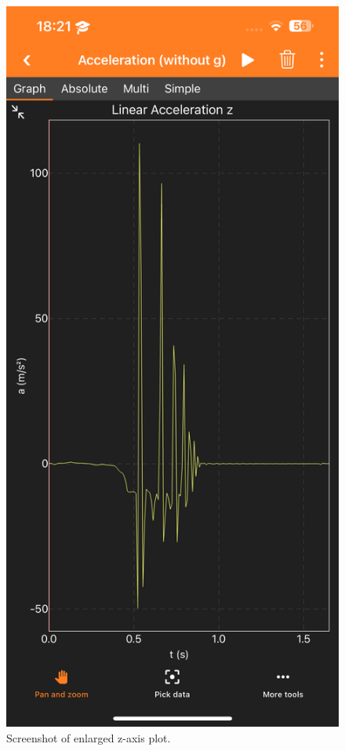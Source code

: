 \documentclass[idxtotoc,hyperref,openany]{labbook} %
\begin{document}
\begin{figure}[H] %
\begin{center}
\includegraphics[width=.7\linewidth]{images/Lab.02/PhoneDropZ.PNG}
\end{center}
\caption{Screenshot of enlarged z-axis plot.}
\label{fig:Lab02-PhoneDropZ}
\end{figure}
\end{document}
